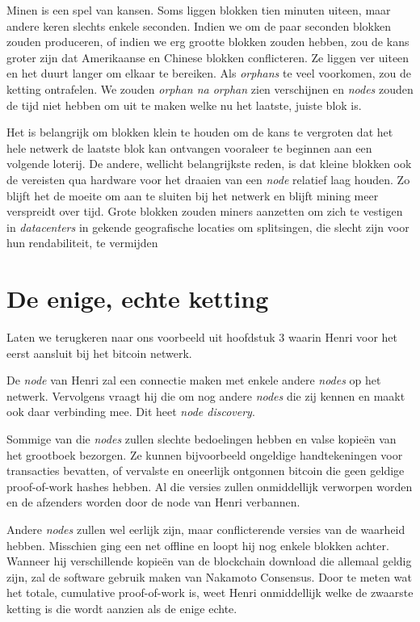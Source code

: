 \documentclass[
  letterpaper,
]{scrbook}
\begin{document}
Minen is een spel van kansen. Soms liggen blokken tien minuten uiteen,
maar andere keren slechts enkele seconden. Indien we om de paar seconden
blokken zouden produceren, of indien we erg grootte blokken zouden
hebben, zou de kans groter zijn dat Amerikaanse en Chinese blokken
conflicteren. Ze liggen ver uiteen en het duurt langer om elkaar te
bereiken. Als \emph{orphans} te veel voorkomen, zou de ketting
ontrafelen. We zouden \emph{orphan na orphan} zien verschijnen en
\emph{nodes} zouden de tijd niet hebben om uit te maken welke nu het
laatste, juiste blok is.

Het is belangrijk om blokken klein te houden om de kans te vergroten dat
het hele netwerk de laatste blok kan ontvangen vooraleer te beginnen aan
een volgende loterij. De andere, wellicht belangrijkste reden, is dat
kleine blokken ook de vereisten qua hardware voor het draaien van een
\emph{node} relatief laag houden. Zo blijft het de moeite om aan te
sluiten bij het netwerk en blijft mining meer verspreidt over tijd.
Grote blokken zouden miners aanzetten om zich te vestigen in
\emph{datacenters} in gekende geografische locaties om splitsingen, die
slecht zijn voor hun rendabiliteit, te vermijden

\hypertarget{de-enige-echte-ketting}{%
\section{De enige, echte ketting}\label{de-enige-echte-ketting}}

Laten we terugkeren naar ons voorbeeld uit hoofdstuk 3 waarin Henri voor
het eerst aansluit bij het bitcoin netwerk.

De \emph{node} van Henri zal een connectie maken met enkele andere
\emph{nodes} op het netwerk. Vervolgens vraagt hij die om nog andere
\emph{nodes} die zij kennen en maakt ook daar verbinding mee. Dit heet
\emph{node discovery}.

Sommige van die \emph{nodes} zullen slechte bedoelingen hebben en valse
kopieën van het grootboek bezorgen. Ze kunnen bijvoorbeeld ongeldige
handtekeningen voor transacties bevatten, of vervalste en oneerlijk
ontgonnen bitcoin die geen geldige proof-of-work hashes hebben. Al die
versies zullen onmiddellijk verworpen worden en de afzenders worden door
de node van Henri verbannen.

Andere \emph{nodes} zullen wel eerlijk zijn, maar conflicterende versies
van de waarheid hebben. Misschien ging een net offline en loopt hij nog
enkele blokken achter. Wanneer hij verschillende kopieën van de
blockchain download die allemaal geldig zijn, zal de software gebruik
maken van Nakamoto Consensus. Door te meten wat het totale, cumulative
proof-of-work is, weet Henri onmiddellijk welke de zwaarste ketting is
die wordt aanzien als de enige echte.
\end{document}

